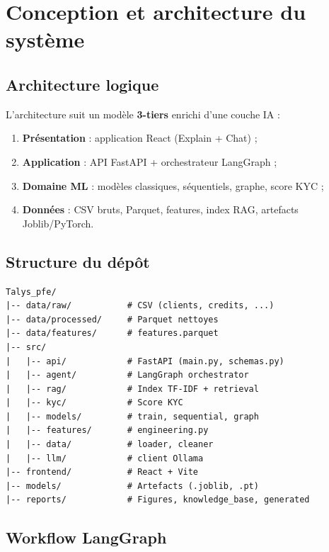\chapter{Conception et architecture du système}
\label{ch:conception}

\section{Architecture logique}

L'architecture suit un modèle \textbf{3-tiers} enrichi d'une couche IA :

\begin{enumerate}[leftmargin=*]
  \item \textbf{Présentation} : application React (Explain + Chat) ;
  \item \textbf{Application} : API FastAPI + orchestrateur LangGraph ;
  \item \textbf{Domaine ML} : modèles classiques, séquentiels, graphe, score KYC ;
  \item \textbf{Données} : CSV bruts, Parquet, features, index RAG, artefacts Joblib/PyTorch.
\end{enumerate}


\section{Structure du dépôt}

\begin{lstlisting}[caption={Arborescence principale du projet},label={lst:tree}]
Talys_pfe/
|-- data/raw/           # CSV (clients, credits, ...)
|-- data/processed/     # Parquet nettoyes
|-- data/features/      # features.parquet
|-- src/
|   |-- api/            # FastAPI (main.py, schemas.py)
|   |-- agent/          # LangGraph orchestrator
|   |-- rag/            # Index TF-IDF + retrieval
|   |-- kyc/            # Score KYC
|   |-- models/         # train, sequential, graph
|   |-- features/       # engineering.py
|   |-- data/           # loader, cleaner
|   |-- llm/            # client Ollama
|-- frontend/           # React + Vite
|-- models/             # Artefacts (.joblib, .pt)
|-- reports/            # Figures, knowledge_base, generated
\end{lstlisting}

\section{Workflow LangGraph}

